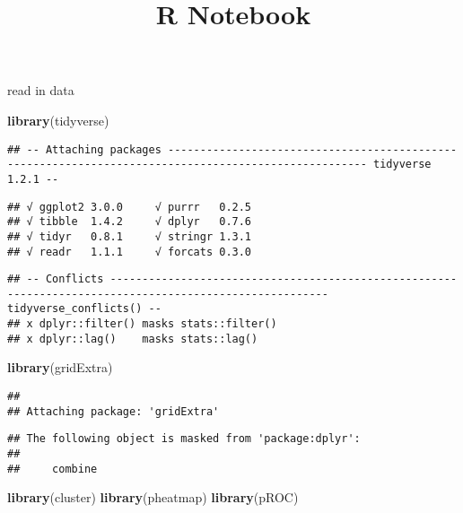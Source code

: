 \documentclass[]{article}
\title{R Notebook}
\author{}
\date{}
\newenvironment{Shaded}{\begin{snugshade}}{\end{snugshade}}
\newcommand{\KeywordTok}[1]{\textcolor[rgb]{0.13,0.29,0.53}{\textbf{#1}}}
\newcommand{\NormalTok}[1]{#1}
\begin{document}
\maketitle

read in data

\begin{Shaded}
\begin{Highlighting}[]
\KeywordTok{library}\NormalTok{(tidyverse)}
\end{Highlighting}
\end{Shaded}

\begin{verbatim}
## -- Attaching packages ----------------------------------------------------------------------------------------------------- tidyverse 1.2.1 --
\end{verbatim}

\begin{verbatim}
## √ ggplot2 3.0.0     √ purrr   0.2.5
## √ tibble  1.4.2     √ dplyr   0.7.6
## √ tidyr   0.8.1     √ stringr 1.3.1
## √ readr   1.1.1     √ forcats 0.3.0
\end{verbatim}

\begin{verbatim}
## -- Conflicts -------------------------------------------------------------------------------------------------------- tidyverse_conflicts() --
## x dplyr::filter() masks stats::filter()
## x dplyr::lag()    masks stats::lag()
\end{verbatim}

\begin{Shaded}
\begin{Highlighting}[]
\KeywordTok{library}\NormalTok{(gridExtra)}
\end{Highlighting}
\end{Shaded}

\begin{verbatim}
## 
## Attaching package: 'gridExtra'
\end{verbatim}

\begin{verbatim}
## The following object is masked from 'package:dplyr':
## 
##     combine
\end{verbatim}

\begin{Shaded}
\begin{Highlighting}[]
\KeywordTok{library}\NormalTok{(cluster)}
\KeywordTok{library}\NormalTok{(pheatmap)}
\KeywordTok{library}\NormalTok{(pROC)}
\end{Highlighting}
\end{Shaded}
\end{document}
